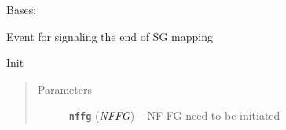 \documentclass[letterpaper,10pt,english]{sphinxmanual}
\begin{document}

\begin{fulllineitems}
\label{service/sas_mapping:escape.service.sas_mapping.SGMappingFinishedEvent}
Bases: 

Event for signaling the end of SG mapping

\begin{fulllineitems}
\label{service/sas_mapping:escape.service.sas_mapping.SGMappingFinishedEvent.__init__}
Init
\begin{quote}\begin{description}
\item[{Parameters}] \leavevmode
\textbf{\texttt{nffg}} ({\hyperref[util/nffg:escape.util.nffg.NFFG]{\emph{\emph{NFFG}}}}) -- NF-FG need to be initiated

\end{description}\end{quote}

\end{fulllineitems}


\end{fulllineitems}

\end{document}
